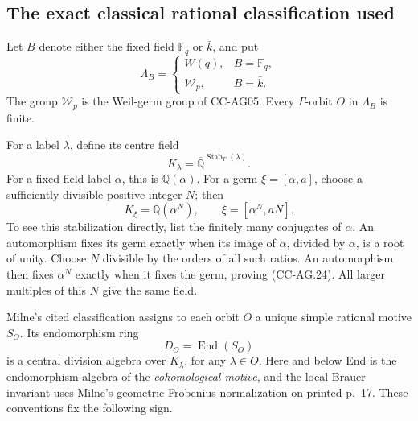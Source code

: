 \subsection{The exact classical rational classification used}

Let \(B\) denote either the fixed field \(\mathbb F_q\) or
\(\bar k\), and put
\[
 \Lambda_B=
 \begin{cases}
      W(q),&B=\mathbb F_q,\\
      \mathcal W_p,&B=\bar k.
 \end{cases}
\]
The group \(\mathcal W_p\) is the Weil-germ group of CC-AG05.
Every \(\Gamma\)-orbit \(O\) in \(\Lambda_B\) is finite.

For a label \(\lambda\), define its centre field
\[
        K_\lambda=
        \overline{\mathbb Q}^{\operatorname{Stab}_\Gamma(\lambda)}.
                                                               \tag{CC-AG.23}
\]
For a fixed-field label \(\alpha\), this is
\(\mathbb Q(\alpha)\).  For a germ
\(\xi=[\alpha,a]\), choose a sufficiently divisible positive
integer \(N\); then
\[
       K_\xi=\mathbb Q(\alpha^N), \qquad
       \xi=[\alpha^N,aN].                                    \tag{CC-AG.24}
\]
To see this stabilization directly, list the finitely many
conjugates of \(\alpha\).  An automorphism fixes its germ
exactly when its image of \(\alpha\), divided by \(\alpha\),
is a root of unity.  Choose \(N\) divisible by the orders of
all such ratios.  An automorphism then fixes \(\alpha^N\)
exactly when it fixes the germ, proving (CC-AG.24).
All larger multiples of this \(N\) give the same field.

Milne's cited classification assigns to each orbit \(O\) a
unique simple rational motive \(S_O\).  Its endomorphism ring
\[
           D_O=\operatorname{End}(S_O)
\]
is a central division algebra over \(K_\lambda\), for any
\(\lambda\in O\).  Here and below End is the endomorphism
algebra of the \emph{cohomological motive}, and the local
Brauer invariant uses Milne's geometric-Frobenius
normalization on printed p.~17.  These conventions fix
the following sign.

